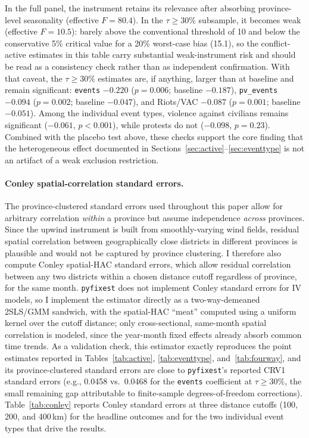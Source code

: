 \documentclass[12pt]{article}
\begin{document}
In the full panel, the instrument retains its relevance after absorbing province-level seasonality (effective $F = 80.4$). In the $\tau \geq 30\%$ subsample, it becomes weak (effective $F = 10.5$): barely above the conventional threshold of 10 and below the conservative 5\% critical value for a 20\% worst-case bias (15.1), so the conflict-active estimates in this table carry substantial weak-instrument risk and should be read as a consistency check rather than as independent confirmation. With that caveat, the $\tau \geq 30\%$ estimates are, if anything, larger than at baseline and remain significant: \texttt{events} $-0.220$ ($p=0.006$; baseline $-0.187$), \texttt{pv\_events} $-0.094$ ($p=0.002$; baseline $-0.047$), and Riots/VAC $-0.087$ ($p=0.001$; baseline $-0.051$). Among the individual event types, violence against civilians remains significant ($-0.061$, $p<0.001$), while protests do not ($-0.098$, $p=0.23$). Combined with the placebo test above, these checks support the core finding that the heterogeneous effect documented in Sections~\ref{sec:active}--\ref{sec:eventtype} is not an artifact of a weak exclusion restriction.

\paragraph{Conley spatial-correlation standard errors.} The province-clustered standard errors used throughout this paper allow for arbitrary correlation \emph{within} a province but assume independence \emph{across} provinces. Since the upwind instrument is built from smoothly-varying wind fields, residual spatial correlation between geographically close districts in different provinces is plausible and would not be captured by province clustering. I therefore also compute Conley \citep{conley1999} spatial-HAC standard errors, which allow residual correlation between any two districts within a chosen distance cutoff regardless of province, for the same month. \texttt{pyfixest} does not implement Conley standard errors for IV models, so I implement the estimator directly as a two-way-demeaned 2SLS/GMM sandwich, with the spatial-HAC ``meat'' computed using a uniform kernel over the cutoff distance; only cross-sectional, same-month spatial correlation is modeled, since the year-month fixed effects already absorb common time trends. As a validation check, this estimator exactly reproduces the point estimates reported in Tables~\ref{tab:active}, \ref{tab:eventtype}, and~\ref{tab:fourway}, and its province-clustered standard errors are close to \texttt{pyfixest}'s reported CRV1 standard errors (e.g., 0.0458 vs.\ 0.0468 for the \texttt{events} coefficient at $\tau \geq 30\%$, the small remaining gap attributable to finite-sample degrees-of-freedom corrections). Table~\ref{tab:conley} reports Conley standard errors at three distance cutoffs (100, 200, and 400\,km) for the headline outcomes and for the two individual event types that drive the results.
\end{document}
